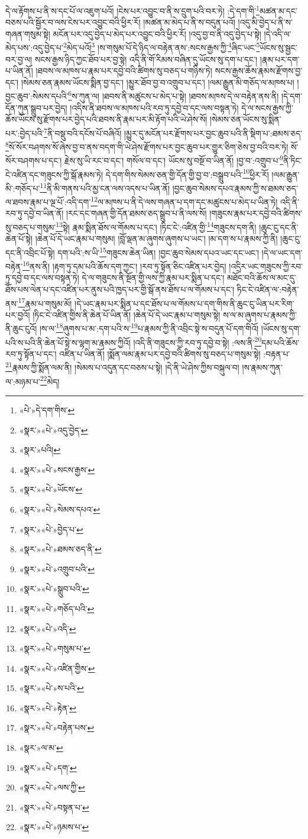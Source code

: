 དེ་ལ་རྟོགས་པ་ནི་ས་དང་པོ་ལ་འཇུག་པའོ། །ངེས་པར་འབྱུང་བ་ནི་ས་དྲུག་པའི་བར་ཏེ། :དེ་དག་གི་\footnote{«པེ་»དེ་དག་གིས་}མཚན་མ་དང་བཅས་པའི་སྦྱོར་བ་ལས་ངེས་པར་འབྱུང་བའི་ཕྱིར་རོ། །མཚན་མ་མེད་པ་ནི་ས་བདུན་པའོ། །འདུ་མི་བྱེད་པ་ནི་ས་གཞན་གསུམ་སྟེ། མངོན་པར་འདུ་བྱེད་པ་མེད་པར་འབྱུང་བའི་ཕྱིར་རོ། །འདུ་བྱ་བ་ནི་འདུ་བྱེད་པ་སྟེ། །དེ་འདི་ལ་མེད་པས་:འདུ་བྱེད་པ་\footnote{«སྣར་»«པེ་»འདུ་བྱེད་}མེད་པའོ།\footnote{«སྣར་»པའི།} །ས་གསུམ་པོ་དེ་ཉིད་ལ་བརྟེན་ནས་:སངས་རྒྱས་ཀྱི་\footnote{«སྣར་»«པེ་»སངས་རྒྱས་}ཞིང་ཡང་\footnote{«སྣར་»«པེ་»ཡོངས་}ཡོངས་སུ་སྦྱང་བར་བྱ་ལ། སངས་རྒྱས་ཉིད་ཀྱང་ཐོབ་པར་བྱ་སྟེ། འདི་ནི་གོ་རིམས་བཞིན་དུ་ཡོངས་སུ་དག་པ་དང་། །རྣམ་པར་དག་པ་ཡིན་ནོ། །ཐབས་ལ་མཁས་པ་རྣམ་པར་དབྱེ་བའི་ཚིགས་སུ་བཅད་པ་གཉིས་ཏེ། སངས་རྒྱས་ཆོས་རྣམས་རྫོགས་བྱ་དང་། །སེམས་ཅན་རྣམས་ཡོངས་སྨིན་བྱ་དང་། །མྱུར་ཐོབ་བྱ་བ་འགྲུབ་པ་དང་། །ལམ་རྒྱུན་མི་གཅོད་ལ་མཁས་པ། །བྱང་ཆུབ་:སེམས་དཔའི་\footnote{«སྣར་»«པེ་»སེམས་དཔའ་}ས་ཀུན་ལ། །ཐབས་ནི་མཚུངས་པ་མེད་པ་སྟེ། །ཐབས་མཁས་དེ་ལ་བརྟེན་ནས་ནི། །དེ་དག་དོན་ཀུན་སྒྲུབ་པར་བྱེད། །འདིས་ནི་ཐབས་ལ་མཁས་པའི་རབ་ཏུ་དབྱེ་བ་དང་ལས་བསྟན་ཏེ། དེ་ལ་སངས་རྒྱས་ཀྱི་ཆོས་ཡོངས་སུ་རྫོགས་པར་བྱེད་པའི་ཐབས་ནི་རྣམ་པར་མི་རྟོག་པའི་ཡེ་ཤེས་སོ། །སེམས་ཅན་ཡོངས་སུ་སྨིན་པར་:བྱེད་པའི་\footnote{«སྣར་»«པེ་»བྱེད་པ་}ནི་བསྡུ་བའི་དངོས་པོ་བཞིའོ། །མྱུར་དུ་མངོན་པར་རྫོགས་པར་བྱང་ཆུབ་པའི་ནི་སྡིག་པ་:ཐམས་ཅད་\footnote{«སྣར་»«པེ་»ཐམས་ཅད་ནི་}སོ་སོར་བཤགས་སོ་ཞེས་བྱ་བ་ནས་བདག་གི་ཡེ་ཤེས་རྫོགས་པར་བྱང་ཆུབ་པར་གྱུར་ཅིག་ཅེས་བྱ་བའི་བར་ཏེ། སོ་སོར་བཤགས་པ་དང་། རྗེས་སུ་ཡི་རང་བ་དང་། གསོལ་བ་དང་། ཡོངས་སུ་བསྔོ་བ་ཡིན་ནོ། །བྱ་བ་:འགྲུབ་པ་\footnote{«སྣར་»«པེ་»འགྲུབ་པའི་}ནི་ཏིང་ངེ་འཛིན་དང་གཟུངས་ཀྱི་སྒོ་རྣམས་ཏེ། དེ་དག་གིས་སེམས་ཅན་གྱི་དོན་གྱི་བྱ་བ་:བསྒྲུབ་པའི་\footnote{«སྣར་»«པེ་»སྒྲུབ་པའི་}ཕྱིར་རོ། །ལམ་རྒྱུན་མི་:གཅོད་པ་\footnote{«སྣར་»«པེ་»གཅོད་པའི་}ནི་མི་གནས་པའི་མྱ་ངན་ལས་འདས་པ་ཡིན་ནོ། །བྱང་ཆུབ་སེམས་དཔའ་རྣམས་ཀྱི་ས་ཐམས་ཅད་ལ་ཐབས་རྣམ་པ་ལྔ་པོ་:འདི་དག་\footnote{«སྣར་»«པེ་»འདི་}ལ་མཁས་པ་ནི་དེ་ལས་གཞན་པ་དག་དང་མཚུངས་པ་མེད་པ་ཡིན་ཏེ། འདི་ནི་རབ་ཏུ་དབྱེ་བ་ཡིན་ནོ། །རང་དང་གཞན་གྱི་དོན་ཐམས་ཅད་སྒྲུབ་པ་ནི་ལས་སོ། །གཟུངས་རྣམ་པར་དབྱེ་བའི་ཚིགས་སུ་བཅད་པ་གསུམ་\footnote{«སྣར་»«པེ་»གསུམ་པ་}སྟེ། རྣམ་སྨིན་ཐོས་ལ་གོམས་པ་དང་། །ཏིང་ངེ་:འཛིན་གྱི་\footnote{«སྣར་»«པེ་»འཛིན་གྱིས་}གཟུངས་དག་ནི། །ཆུང་ངུ་དང་ནི་ཆེན་པོ་སྟེ། །ཆེན་པོ་དེ་ཡང་རྣམ་པ་གསུམ། །བློ་ལྡན་མ་ཞུགས་ཞུགས་པ་ཡང་། །མ་དག་ས་པ་རྣམས་ཀྱི་ནི། །ཆུང་ངུ་དང་ནི་འབྲིང་པོ་སྟེ། དག་པའི་:ས་ཡི་\footnote{«སྣར་»«པེ་»ས་པའི་}གཟུངས་ཆེན་ཡིན། །བྱང་ཆུབ་སེམས་དཔའ་ཡང་དང་ཡང་། །དེ་ལ་ཡང་དག་བརྟེན་\footnote{«སྣར་»«པེ་»རྟེན་}ནས་ནི། །རྟག་ཏུ་དམ་པའི་ཆོས་དག་ཀྱང་། །རབ་ཏུ་སྟོན་ཅིང་འཛིན་པར་བྱེད། །འདྲིར་ཡང་གཟུངས་ཀྱི་རབ་ཏུ་དབྱེ་བ་དང་ལས་བསྟན་ཏེ། དེ་ལ་གཟུངས་ནི་སྔོན་གྱི་ལས་ཀྱི་རྣམ་པར་སྨིན་པ་དང་། མཐོང་བའི་ཆོས་ལ་མང་དུ་ཐོས་པས་ལེན་པ་དང་འཛིན་པར་ནུས་པའི་ཁྱད་པར་གྱི་སྒོ་ནས་ཐོས་པ་ལ་གོམས་པ་དང་། ཏིང་ངེ་འཛིན་ལ་:བརྟེན་ནས་\footnote{«སྣར་»«པེ་»བརྟེན་པས་}རྣམ་པ་གསུམ་མོ། །དེ་ཡང་རྣམ་པར་སྨིན་པ་དང་ཐོས་པ་ལ་གོམས་པ་དག་གིས་ནི་ཆུང་ངུ་ཡིན་པར་རིག་པར་བྱའོ། །ཏིང་ངེ་འཛིན་གྱིས་ནི་ཆེན་པོ་ཡིན་ནོ། །ཆེན་པོ་དེ་ཡང་རྣམ་པ་གསུམ་སྟེ། ས་ལ་མ་ཞུགས་པ་རྣམས་ཀྱི་ནི་ཆུང་ངུའོ། །ས་ལ་\footnote{«སྣར་»ལ་མ་}ཞུགས་པ་མ་:དག་པའི་ས་\footnote{«སྣར་»«པེ་»དག་}པ་རྣམས་ཀྱི་ནི་འབྲིང་སྟེ་ས་བདུན་པོ་དག་གིའོ། །ཡོངས་སུ་དག་པའི་ས་པའི་ནི་ཆེན་པོ་སྟེ་ས་ལྷག་མ་རྣམས་ཀྱིའོ། །འདི་ནི་གཟུངས་ཀྱི་རབ་ཏུ་དབྱེ་བ་སྟེ། :ལས་ནི་\footnote{«སྣར་»«པེ་»ལས་ཀྱི་}དམ་པའི་ཆོས་རབ་ཏུ་སྟོན་པ་དང་། འཛིན་པ་ཡིན་ནོ། །སྨོན་ལམ་རྣམ་པར་དབྱེ་བའི་ཚིགས་སུ་བཅད་པ་གསུམ་སྟེ། :བརྟན་པ་\footnote{«སྣར་»«པེ་»བསྟན་པ་}རྣམས་ཀྱི་སྨོན་ལམ་ནི། །སེམས་པ་འདུན་དང་བཅས་པ་སྟེ། །དེ་ནི་ཡེ་ཤེས་ཀྱིས་བསྐུལ་བ། །ས་རྣམས་ཀུན་ལ་:མཉམ་པ་\footnote{«སྣར་»«པེ་»ཉམས་པ་}མེད། 